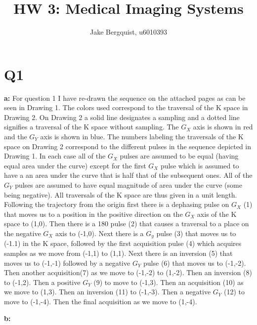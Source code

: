 \documentclass[12pt]{article}
\begin{document}
\title{HW 3: Medical Imaging Systems}
\author{Jake Bergquist, u6010393 }
\maketitle

\section{Q1}
\noindent\textbf{a: }
For question 1 I have re-drawn the sequence on the attached pages as can be seen in Drawing 1.  The colors used correspond to the traversal of the K space in Drawing 2. On Drawing 2 a solid line designates a sampling and a dotted line signifies a traversal of the K space without sampling. The $G_X$ axis is shown in red and the $G_Y$ axis is shown in blue. The numbers labeling the traversals of the K space on Drawing 2 correspond to the different pulses in the sequence depicted in Drawing 1. In each case all of the $G_X$ pulses are assumed to be equal (having equal area under the curve) except for the first $G_X$ pulse which is assumed to have a an area under the curve that is half that of the subsequent ones. All of the $G_Y$ pulses are assumed to have equal magnitude of area under the curve (some being negative). All traversals of the K space are thus given in a unit length. Following the trajectory from the origin first there is a dephasing pulse on $G_X$ (1) that moves us to a position in the positive direction on the $G_X$ axis of the K space to (1,0). Then there is a 180 pulse (2) that causes a traversal to a place on the negative $G_X$ axis to (-1,0). Next there is a $G_y$ pulse (3) that moves us to (-1.1) in the K space, followed by the first acquisition pulse (4) which acquires samples as we move from (-1,1) to (1,1). Next there is an inversion (5) that moves us to (-1,-1) followed by a negative $G_Y$ pulse (6) that moves us to (-1,-2). Then another acquisition(7) as we move to (-1,-2) to (1,-2). Then an inversion (8) to (-1,2). Then a positive $G_Y$ (9) to move to (-1,3). Then an acquisition (10) as we move to (1,3). Then an inversion (11) to (-1,-3). Then a negative $G_Y$ (12) to move to (-1,-4). Then the final acquisition as we move to (1,-4).

\noindent\textbf{b: }
\end{document}
